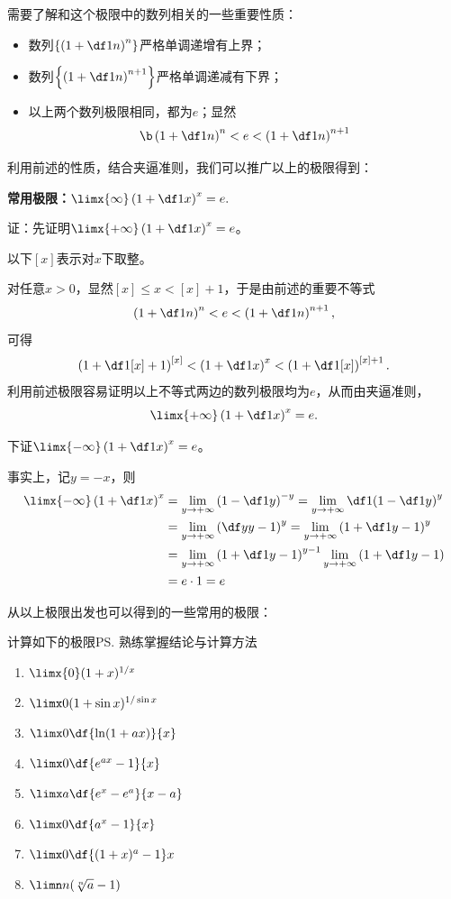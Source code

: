 需要了解和这个极限中的数列相关的一些重要性质：
\begin{itemize}
  \setlength{\itemindent}{1cm}
  \item 数列$\left\{\left(1+\df 1n\right)^n\right\}$严格单调递增有上界；
  \item 数列$\left\{\left(1+\df 1n\right)^{n+1}\right\}$严格单调递减有下界；
  \item 以上两个数列极限相同，都为$e$；显然
  $$\b\left(1+\df1n\right)^n<e<\left(1+\df1n\right)^{n+1}$$
\end{itemize}

利用前述的性质，结合夹逼准则，我们可以推广以上的极限得到：
\begin{thx}
	{\bf 常用极限：}$\limx{\infty}\left(1+\df1x\right)^x=e.$
\end{thx}

证：先证明$\limx{+\infty}\left(1+\df1x\right)^x=e$。

以下$[x]$表示对$x$下取整。

对任意$x>0$，显然$[x]\leq x<[x]+1$，于是由前述的重要不等式
$$\left(1+\df1n\right)^n<e<\left(1+\df1n\right)^{n+1},$$
可得
$$\left(1+\df1{[x]+1}\right)^{[x]}<\left(1+\df1x\right)^x
<\left(1+\df1{[x]}\right)^{[x]+1}.$$
利用前述极限容易证明以上不等式两边的数列极限均为$e$，从而由夹逼准则，
$$\limx{+\infty}\left(1+\df1x\right)^x=e.$$

下证$\limx{-\infty}\left(1+\df1x\right)^x=e$。

事实上，记$y=-x$，则
\begin{align*}
	\limx{-\infty}\left(1+\df1x\right)^x
	&=\lim\limits_{y\to+\infty}\left(1-\df1y\right)^{-y}
	=\lim\limits_{y\to+\infty}\df1{\left(1-\df1y\right)^{y}}\\
	&=\lim\limits_{y\to+\infty}\left(\df y{y-1}\right)^{y}
	=\lim\limits_{y\to+\infty}\left(1+\df1{y-1}\right)^{y}\\
	&=\lim\limits_{y\to+\infty}\left(1+\df1{y-1}\right)^{y-1}
	\lim\limits_{y\to+\infty}\left(1+\df1{y-1}\right)\\
	&=e\cdot1=e
\end{align*}
\fin

\bs
从以上极限出发也可以得到的一些常用的极限：

\egz 计算如下的极限\ps{\baa 熟练掌握结论与计算方法}
\begin{enumerate}[(1)]
   \setlength{\itemindent}{1cm}
  \item $\limx{0}(1+x)^{1/x}$ 
  \item $\limx 0(1+\sin x)^{1/\sin x}$ 
  \item $\limx 0\df{\ln(1+ax)}{x}$
  \item $\limx 0\df{e^{ax}-1}{x}$ 
  \item $\limx a\df{e^x-e^a}{x-a}$
  \item $\limx 0\df{a^x-1}{x}$ 
  \item $\limx 0\df{(1+x)^a-1}x$
  \item $\limn n(\sqrt[n]{a}-1)$ 
\end{enumerate}

